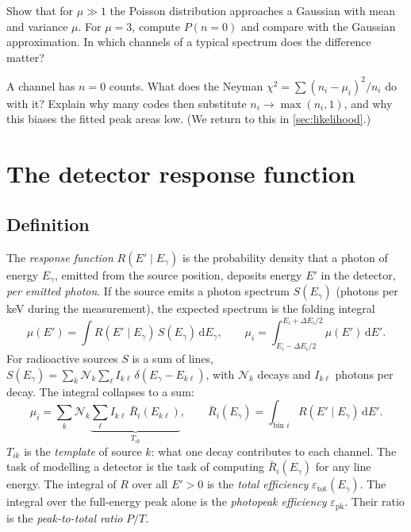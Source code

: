 \documentclass[11pt]{article}
\newcounter{exercise}[section]
\newcommand{\dd}{\mathrm{d}}
\begin{document}
\begin{exercise}[A]
Show that for $\mu \gg 1$ the Poisson distribution approaches a Gaussian with mean and variance $\mu$. For $\mu = 3$, compute $P(n=0)$ and compare with the Gaussian approximation. In which channels of a typical spectrum does the difference matter?
\end{exercise}

\begin{exercise}[A]
A channel has $n=0$ counts. What does the Neyman $\chi^2 = \sum (n_i-\mu_i)^2/n_i$ do with it? Explain why many codes then substitute $n_i \to \max(n_i,1)$, and why this biases the fitted peak areas low. (We return to this in \cref{sec:likelihood}.)
\end{exercise}

\section{The detector response function}\label{sec:response}
\subsection{Definition}
The \emph{response function} $R(E'\mid E_\gamma)$ is the probability density that a photon of energy $E_\gamma$, emitted from the source position, deposits energy $E'$ in the detector, \emph{per emitted photon}. If the source emits a photon spectrum $S(E_\gamma)$ (photons per keV during the measurement), the expected spectrum is the folding integral
\begin{equation}
\mu(E') = \int R(E'\mid E_\gamma)\,S(E_\gamma)\,\dd E_\gamma, \qquad
\mu_i = \int_{E_i-\Delta E_i/2}^{E_i+\Delta E_i/2}\mu(E')\,\dd E'. \label{eq:fold}
\end{equation}
For radioactive sources $S$ is a sum of lines, $S(E_\gamma) = \sum_k \mathcal N_k \sum_\ell I_{k\ell}\,\delta(E_\gamma - E_{k\ell})$, with $\mathcal N_k$ decays and $I_{k\ell}$ photons per decay. The integral collapses to a sum:
\begin{equation}
\mu_i = \sum_k \mathcal N_k \underbrace{\sum_\ell I_{k\ell}\,\bar R_i(E_{k\ell})}_{T_{ik}},\qquad \bar R_i(E_\gamma) = \int_{\text{bin } i} R(E'\mid E_\gamma)\,\dd E'. \label{eq:template}
\end{equation}
$T_{ik}$ is the \emph{template} of source $k$: what one decay contributes to each channel. The task of modelling a detector is the task of computing $\bar R_i(E_\gamma)$ for any line energy. The integral of $R$ over all $E'>0$ is the \emph{total efficiency} $\varepsilon_\text{tot}(E_\gamma)$. The integral over the full-energy peak alone is the \emph{photopeak efficiency} $\varepsilon_\text{pk}$. Their ratio is the \emph{peak-to-total ratio} $P/T$.
\end{document}
